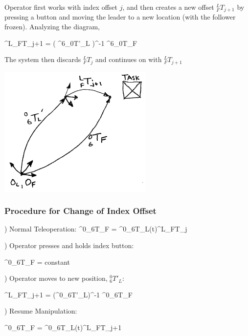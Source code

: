  Operator first works with index offset $j$, and then creates a new offset $^L_FT_{j+1}$ by pressing a button and moving the leader to a new location (with the follower frozen).  Analyzing the diagram, 	%

\bq
^L_FT_{j+1} = \left ( ^6_0T'_L \right )^{-1} {^6_0T_F}
\eq


The system then discards $^L_FT_j$ and continues on with $^L_FT_{j+1}$

\includegraphics[width=3.0in]{figs14/00407a.png}

\subsubsection{Procedure for Change of Index Offset}

) Normal Teleoperation:
\bq
^0_6T_F = ^0_6T_L(t)^L_FT_j
\eq

) Operator presses and holds index button:


\bq
{} \qquad ^0_6T_F = constant
\eq

) Operator moves to new position, $^0_6T'_L$:

\bq
^L_FT_{j+1} = \left (^0_6T'_L\right )^{-1} {^0_6T_F}
\eq

) Resume Manipulation:

\bq
^0_6T_F = ^0_6T_L(t)^L_FT_{j+1}
\eq





